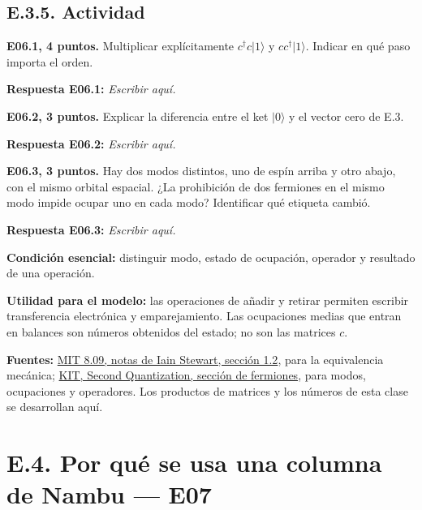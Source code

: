\documentclass[
  spanish,
  10pt,
  a4paper,
]{article}
\begin{document}
\subsection{E.3.5. Actividad}\label{e.3.5.-actividad}


\textbf{E06.1, 4 puntos.} Multiplicar explícitamente
\(c^\dagger c|1\rangle\) y \(cc^\dagger|1\rangle\). Indicar en qué paso
importa el orden.

\textbf{Respuesta E06.1:} \emph{Escribir aquí.}


\textbf{E06.2, 3 puntos.} Explicar la diferencia entre el ket
\(|0\rangle\) y el vector cero de E.3.

\textbf{Respuesta E06.2:} \emph{Escribir aquí.}


\textbf{E06.3, 3 puntos.} Hay dos modos distintos, uno de espín arriba y
otro abajo, con el mismo orbital espacial. ¿La prohibición de dos
fermiones en el mismo modo impide ocupar uno en cada modo? Identificar
qué etiqueta cambió.

\textbf{Respuesta E06.3:} \emph{Escribir aquí.}

\textbf{Condición esencial:} distinguir modo, estado de ocupación,
operador y resultado de una operación.

\textbf{Utilidad para el modelo:} las operaciones de añadir y retirar
permiten escribir transferencia electrónica y emparejamiento. Las
ocupaciones medias que entran en balances son números obtenidos del
estado; no son las matrices \(c\).

\textbf{Fuentes:}
\href{https://ocw.mit.edu/courses/8-09-classical-mechanics-iii-fall-2014/d9bac33f6c60b304dc0398e99b327102_MIT8_09F14_full.pdf}{MIT
8.09, notas de Iain Stewart, sección 1.2}, para la equivalencia
mecánica;
\href{https://www.tkm.kit.edu/downloads/ss2016_tkm2/second_quantization.pdf}{KIT,
Second Quantization, sección de fermiones}, para modos, ocupaciones y
operadores. Los productos de matrices y los números de esta clase se
desarrollan aquí.


\bigskip

\section{E.4. Por qué se usa una columna de Nambu ---
E07}\label{e.4.-por-quuxe9-se-usa-una-columna-de-nambu-e07}
\end{document}
